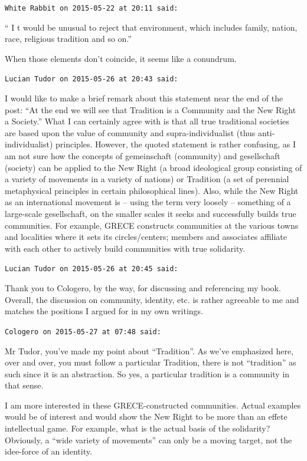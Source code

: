 \begin{footnotesize}
\begin{sffamily}
\texttt{White Rabbit on 2015-05-22 at 20:11 said:}

`` I t would be unusual to reject that environment, which includes family, nation, race, religious tradition and so on.''

When those elements don't coincide, it seems like a conundrum.

\hfill

\texttt{Lucian Tudor on 2015-05-26 at 20:43 said:}

I would like to make a brief remark about this statement near the end of the post: ``At the end we will see that Tradition is a Community and the New Right a Society.'' What I can certainly agree with is that all true traditional societies are based upon the value of community and supra-individualist (thus anti-individualist) principles. However, the quoted statement is rather confusing, as I am not sure how the concepts of gemeinschaft (community) and gesellschaft (society) can be applied to the New Right (a broad ideological group consisting of a variety of movements in a variety of nations) or Tradition (a set of perennial metaphysical principles in certain philosophical lines). Also, while the New Right as an international movement is -- using the term very loosely -- something of a large-scale gesellschaft, on the smaller scales it seeks and successfully builds true communities. For example, GRECE constructs communities at the various towns and localities where it sets its circles/centers; members and associates affiliate with each other to actively build communities with true solidarity.

\hfill

\texttt{Lucian Tudor on 2015-05-26 at 20:45 said:}

Thank you to Cologero, by the way, for discussing and referencing my book. Overall, the discussion on community, identity, etc. is rather agreeable to me and matches the positions I argued for in my own writings.

\hfill

\texttt{Cologero on 2015-05-27 at 07:48 said:}

Mr Tudor, you've made my point about ``Tradition''. As we've emphasized here, over and over, you must follow a particular Tradition, there is not ``tradition'' as such since it is an abstraction. So yes, a particular tradition is a community in that sense.

I am more interested in these GRECE-constructed communities. Actual examples would be of interest and would show the New Right to be more than an effete intellectual game. For example, what is the actual basis of the solidarity? Obviously, a ``wide variety of movements'' can only be a moving target, not the idee-force of an identity.


\end{sffamily}
\end{footnotesize}
